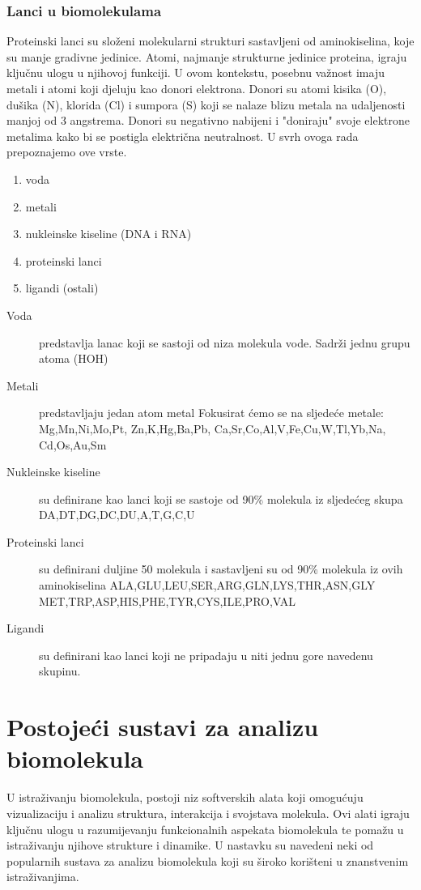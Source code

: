 \documentclass[times, utf8, zavrsni]{fer}
\begin{document}
\subsection{Lanci u biomolekulama}
Proteinski lanci su složeni molekularni strukturi sastavljeni od aminokiselina, koje su manje gradivne jedinice. Atomi, najmanje strukturne jedinice proteina, igraju ključnu ulogu u njihovoj funkciji. U ovom kontekstu, posebnu važnost imaju metali i atomi koji djeluju kao donori elektrona. Donori su atomi kisika (O), dušika (N), klorida (Cl) i sumpora (S) koji se nalaze blizu metala na udaljenosti manjoj od 3 angstrema. Donori su negativno nabijeni i "doniraju" svoje elektrone metalima kako bi se postigla električna neutralnost. U svrh ovoga rada prepoznajemo ove vrste.
 \begin{enumerate}
  \item voda
  \item metali
  \item nukleinske kiseline (DNA i RNA)
   \item proteinski lanci
  \item ligandi (ostali)
  \end{enumerate}

  \begin{description}
   \item[Voda ] predstavlja lanac koji se sastoji od niza molekula vode. Sadrži jednu grupu atoma (HOH)
   \item[Metali ] predstavljaju jedan atom metal Fokusirat ćemo se na sljedeće metale: \linebreak
  		   Mg,Mn,Ni,Mo,Pt, Zn,K,Hg,Ba,Pb, 
		   Ca,Sr,Co,Al,V,Fe,Cu,W,Tl,Yb,Na,
                        Cd,Os,Au,Sm
   \item[Nukleinske kiseline ] su definirane kao lanci koji se sastoje od 90\% molekula iz sljedećeg  skupa DA,DT,DG,DC,DU,A,T,G,C,U

   \item[Proteinski lanci ]  su definirani duljine 50 molekula i sastavljeni su od 90\% molekula iz ovih aminokiselina
			       ALA,GLU,LEU,SER,ARG,GLN,LYS,THR,ASN,GLY \linebreak
                                       MET,TRP,ASP,HIS,PHE,TYR,CYS,ILE,PRO,VAL

   \item[Ligandi ]  su definirani kao lanci koji ne pripadaju u niti jednu gore navedenu skupinu.
  \end{description}

\chapter{Postojeći sustavi za analizu biomolekula}
 U istraživanju biomolekula, postoji niz softverskih alata koji omogućuju vizualizaciju i analizu struktura, interakcija i svojstava molekula.
 Ovi alati igraju ključnu ulogu u razumijevanju funkcionalnih aspekata biomolekula te pomažu u istraživanju njihove strukture i dinamike. 
 U nastavku su navedeni neki od popularnih sustava za analizu biomolekula koji su široko korišteni u znanstvenim istraživanjima.
\end{document}
